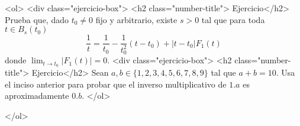 \documentclass{article}
\theoremstyle{definition}
\begin{document}
              <ol>
                <div class="ejercicio-box"> <h2 class="number-title"> Ejercicio</h2> Prueba que,  dado $t_0\ne 0$ fijo y arbitrario, existe $s>0$ tal que para toda $t\in B_s(t_0)$  
              $$
              \frac{1}{t}=\frac{1}{t_0}-\frac{1}{t_0^2}(t-t_0)+|t-t_0|F_1(t)
              $$
              donde $\lim_{t\to t_0} |F_1(t)| =0$.
            <div class="ejercicio-box"> <h2 class="number-title"> Ejercicio</h2> Sean $a,b\in \{1,2,3,4,5,6,7,8,9\}$ tal que $a+b=10$. Usa el inciso anterior para
              probar que el inverso multiplicativo de $1.a$ es aproximadamente $0.b$.
            </ol>
            
          

         
            
</ol>


  
       
\end{document}
